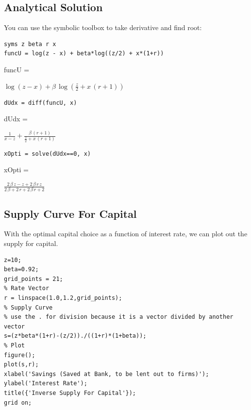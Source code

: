 \documentclass[
]{book}
\begin{document}
\hypertarget{analytical-solution}{%
\subsection{Analytical Solution}\label{analytical-solution}}

You can use the symbolic toolbox to take derivative and find root:

\begin{verbatim}
syms z beta r x
funcU = log(z - x) + beta*log((z/2) + x*(1+r))
\end{verbatim}

funcU =

\(\displaystyle \log \left(z-x\right)+\beta \,\log \left(\frac{z}{2}+x\,{\left(r+1\right)}\right)\)

\begin{verbatim}
dUdx = diff(funcU, x)
\end{verbatim}

dUdx =

\(\displaystyle \frac{1}{x-z}+\frac{\beta \,{\left(r+1\right)}}{\frac{z}{2}+x\,{\left(r+1\right)}}\)

\begin{verbatim}
xOpti = solve(dUdx==0, x)
\end{verbatim}

xOpti =

\(\displaystyle \frac{2\,\beta \,z-z+2\,\beta \,r\,z}{2\,\beta +2\,r+2\,\beta \,r+2}\)

\hypertarget{supply-curve-for-capital}{%
\subsection{Supply Curve For Capital}\label{supply-curve-for-capital}}

With the optimal capital choice as a function of interest rate, we can
plot out the supply for capital.

\begin{verbatim}
z=10;
beta=0.92;
grid_points = 21;
% Rate Vector
r = linspace(1.0,1.2,grid_points);
% Supply Curve
% use the . for division because it is a vector divided by another vector
s=(z*beta*(1+r)-(z/2))./((1+r)*(1+beta));
% Plot
figure();
plot(s,r);
xlabel('Savings (Saved at Bank, to be lent out to firms)');
ylabel('Interest Rate');
title({'Inverse Supply For Capital'});
grid on;
\end{verbatim}
\end{document}
